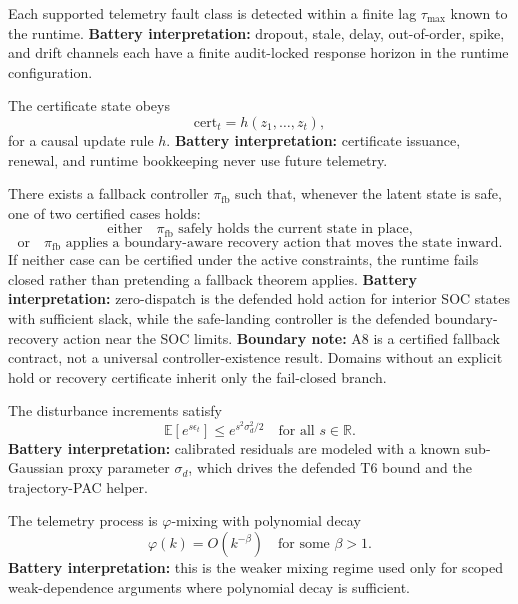 \begin{assumption}\label{assum:A6}
Each supported telemetry fault class is detected within a finite lag
$\tau_{\max}$ known to the runtime.
\textbf{Battery interpretation:} dropout, stale, delay, out-of-order, spike,
and drift channels each have a finite audit-locked response horizon in the
runtime configuration.
\end{assumption}

\begin{assumption}\label{assum:A7}
The certificate state obeys
\[
  \mathrm{cert}_t = h(z_1,\ldots,z_t),
\]
for a causal update rule $h$.
\textbf{Battery interpretation:} certificate issuance, renewal, and runtime
bookkeeping never use future telemetry.
\end{assumption}

\begin{assumption}\label{assum:A8}
There exists a fallback controller $\pi_{\mathrm{fb}}$ such that, whenever the
latent state is safe, one of two certified cases holds:
\[
  \text{either}\quad \pi_{\mathrm{fb}} \text{ safely holds the current state in place,}
\]
\[
  \text{or}\quad \pi_{\mathrm{fb}} \text{ applies a boundary-aware recovery action that moves the state inward.}
\]
If neither case can be certified under the active constraints, the runtime
fails closed rather than pretending a fallback theorem applies.
\textbf{Battery interpretation:} zero-dispatch is the defended hold action for
interior SOC states with sufficient slack, while the safe-landing controller is
the defended boundary-recovery action near the SOC limits.
\textbf{Boundary note:} A8 is a certified fallback contract, not a universal
controller-existence result.  Domains without an explicit hold or recovery
certificate inherit only the fail-closed branch.
\end{assumption}

\begin{assumption}\label{assum:A9}
The disturbance increments satisfy
\[
  \mathbb{E}\!\left[e^{s\epsilon_t}\right] \le e^{s^2\sigma_d^2/2}
  \quad \text{for all } s\in\mathbb{R}.
\]
\textbf{Battery interpretation:} calibrated residuals are modeled with a known
sub-Gaussian proxy parameter $\sigma_d$, which drives the defended T6 bound and
the trajectory-PAC helper.
\end{assumption}

\begin{assumption}\label{assum:A10a}
The telemetry process is $\varphi$-mixing with polynomial decay
\[
  \varphi(k)=O(k^{-\beta})
  \quad \text{for some } \beta>1.
\]
\textbf{Battery interpretation:} this is the weaker mixing regime used only for
scoped weak-dependence arguments where polynomial decay is sufficient.
\end{assumption}


